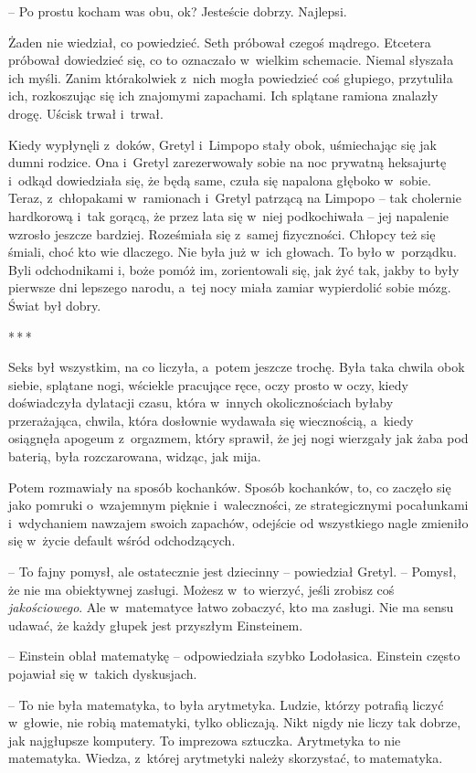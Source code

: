 \documentclass[oneside,polish,11pt,sfheadings]{mwbk}
\newcommand{\threeast}{\bigskip\par\centerline{*\,*\,*}\medskip\par}
\begin{document}
-- Po prostu kocham was obu, ok? Jesteście dobrzy. Najlepsi.

Żaden nie wiedział, co powiedzieć. Seth próbował czegoś mądrego.
Etcetera próbował dowiedzieć się, co to oznaczało w~wielkim schemacie.
Niemal słyszała ich myśli. Zanim którakolwiek z~nich mogła powiedzieć
coś głupiego, przytuliła ich, rozkoszując się ich znajomymi zapachami.
Ich splątane ramiona znalazły drogę. Uścisk trwał i~trwał.

Kiedy wypłynęli z~doków, Gretyl i~Limpopo stały obok, uśmiechając się
jak dumni rodzice. Ona i~Gretyl zarezerwowały sobie na noc prywatną
heksajurtę i~odkąd dowiedziała się, że będą same, czuła się napalona
głęboko w~sobie. Teraz, z~chłopakami w~ramionach i~Gretyl patrzącą na
Limpopo -- tak cholernie hardkorową i~tak gorącą, że przez lata się w~niej podkochiwała -- jej napalenie wzrosło jeszcze bardziej. Roześmiała
się z~samej fizyczności. Chłopcy też się śmiali, choć kto wie dlaczego.
Nie była już w~ich głowach. To było w~porządku. Byli odchodnikami i,
boże pomóż im, zorientowali się, jak żyć tak, jakby to były pierwsze dni
lepszego narodu, a~tej nocy miała zamiar wypierdolić sobie mózg. Świat
był dobry.

\threeast

Seks był wszystkim, na co liczyła, a~potem jeszcze trochę. Była taka
chwila obok siebie, splątane nogi, wściekle pracujące ręce, oczy prosto
w oczy, kiedy doświadczyła dylatacji czasu, która w~innych
okolicznościach byłaby przerażająca, chwila, która dosłownie wydawała
się wiecznością, a~kiedy osiągnęła apogeum z~orgazmem, który sprawił, że
jej nogi wierzgały jak żaba pod baterią, była rozczarowana, widząc, jak
mija.

Potem rozmawiały na sposób kochanków. Sposób kochanków, to, co zaczęło
się jako pomruki o~wzajemnym pięknie i~waleczności, ze strategicznymi
pocałunkami i~wdychaniem nawzajem swoich zapachów, odejście od
wszystkiego nagle zmieniło się w~życie default wśród odchodzących.

-- To fajny pomysł, ale ostatecznie jest dziecinny -- powiedział Gretyl. -- Pomysł, że nie ma obiektywnej zasługi. Możesz w~to wierzyć, jeśli
zrobisz coś \textit{jakościowego}. Ale w~matematyce łatwo zobaczyć, kto ma
zasługi. Nie ma sensu udawać, że każdy głupek jest przyszłym Einsteinem.

-- Einstein oblał matematykę -- odpowiedziała szybko Lodołasica. Einstein
często pojawiał się w~takich dyskusjach.

-- To nie była matematyka, to była arytmetyka. Ludzie, którzy potrafią
liczyć w~głowie, nie robią matematyki, tylko obliczają. Nikt nigdy nie
liczy tak dobrze, jak najgłupsze komputery. To imprezowa sztuczka.
Arytmetyka to nie matematyka. Wiedza, z~której arytmetyki należy
skorzystać, to matematyka.
\end{document}
